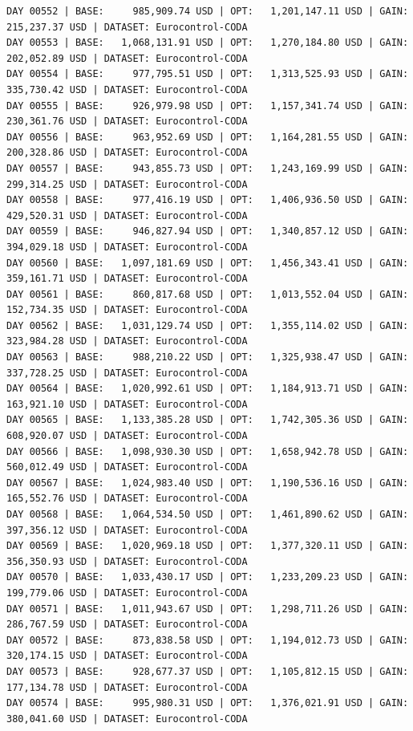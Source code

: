 \documentclass[11pt,a4paper]{article}
\begin{document}
\begin{verbatim}
DAY 00552 | BASE:     985,909.74 USD | OPT:   1,201,147.11 USD | GAIN: 215,237.37 USD | DATASET: Eurocontrol-CODA
DAY 00553 | BASE:   1,068,131.91 USD | OPT:   1,270,184.80 USD | GAIN: 202,052.89 USD | DATASET: Eurocontrol-CODA
DAY 00554 | BASE:     977,795.51 USD | OPT:   1,313,525.93 USD | GAIN: 335,730.42 USD | DATASET: Eurocontrol-CODA
DAY 00555 | BASE:     926,979.98 USD | OPT:   1,157,341.74 USD | GAIN: 230,361.76 USD | DATASET: Eurocontrol-CODA
DAY 00556 | BASE:     963,952.69 USD | OPT:   1,164,281.55 USD | GAIN: 200,328.86 USD | DATASET: Eurocontrol-CODA
DAY 00557 | BASE:     943,855.73 USD | OPT:   1,243,169.99 USD | GAIN: 299,314.25 USD | DATASET: Eurocontrol-CODA
DAY 00558 | BASE:     977,416.19 USD | OPT:   1,406,936.50 USD | GAIN: 429,520.31 USD | DATASET: Eurocontrol-CODA
DAY 00559 | BASE:     946,827.94 USD | OPT:   1,340,857.12 USD | GAIN: 394,029.18 USD | DATASET: Eurocontrol-CODA
DAY 00560 | BASE:   1,097,181.69 USD | OPT:   1,456,343.41 USD | GAIN: 359,161.71 USD | DATASET: Eurocontrol-CODA
DAY 00561 | BASE:     860,817.68 USD | OPT:   1,013,552.04 USD | GAIN: 152,734.35 USD | DATASET: Eurocontrol-CODA
DAY 00562 | BASE:   1,031,129.74 USD | OPT:   1,355,114.02 USD | GAIN: 323,984.28 USD | DATASET: Eurocontrol-CODA
DAY 00563 | BASE:     988,210.22 USD | OPT:   1,325,938.47 USD | GAIN: 337,728.25 USD | DATASET: Eurocontrol-CODA
DAY 00564 | BASE:   1,020,992.61 USD | OPT:   1,184,913.71 USD | GAIN: 163,921.10 USD | DATASET: Eurocontrol-CODA
DAY 00565 | BASE:   1,133,385.28 USD | OPT:   1,742,305.36 USD | GAIN: 608,920.07 USD | DATASET: Eurocontrol-CODA
DAY 00566 | BASE:   1,098,930.30 USD | OPT:   1,658,942.78 USD | GAIN: 560,012.49 USD | DATASET: Eurocontrol-CODA
DAY 00567 | BASE:   1,024,983.40 USD | OPT:   1,190,536.16 USD | GAIN: 165,552.76 USD | DATASET: Eurocontrol-CODA
DAY 00568 | BASE:   1,064,534.50 USD | OPT:   1,461,890.62 USD | GAIN: 397,356.12 USD | DATASET: Eurocontrol-CODA
DAY 00569 | BASE:   1,020,969.18 USD | OPT:   1,377,320.11 USD | GAIN: 356,350.93 USD | DATASET: Eurocontrol-CODA
DAY 00570 | BASE:   1,033,430.17 USD | OPT:   1,233,209.23 USD | GAIN: 199,779.06 USD | DATASET: Eurocontrol-CODA
DAY 00571 | BASE:   1,011,943.67 USD | OPT:   1,298,711.26 USD | GAIN: 286,767.59 USD | DATASET: Eurocontrol-CODA
DAY 00572 | BASE:     873,838.58 USD | OPT:   1,194,012.73 USD | GAIN: 320,174.15 USD | DATASET: Eurocontrol-CODA
DAY 00573 | BASE:     928,677.37 USD | OPT:   1,105,812.15 USD | GAIN: 177,134.78 USD | DATASET: Eurocontrol-CODA
DAY 00574 | BASE:     995,980.31 USD | OPT:   1,376,021.91 USD | GAIN: 380,041.60 USD | DATASET: Eurocontrol-CODA

\end{verbatim}
\end{document}
